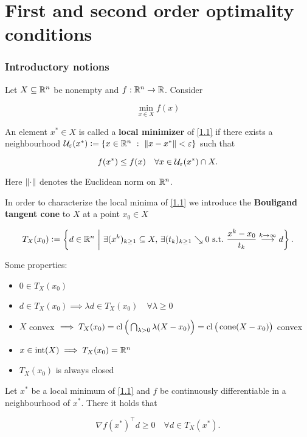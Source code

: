 \part{First and second order optimality conditions}

\section{Introductory notions}

Let \(X \subseteq \mathbb{R}^n\) be nonempty and \(f : \mathbb{R}^n \to \mathbb{R}\). Consider

\begin{equation}\label{1.1}
    \min_{x \in X} f(x)
\end{equation}

An element \(x^* \in X\) is called a \textbf{local minimizer} of \eqref{1.1} if there exists a neighbourhood \(\mathcal{U}_\varepsilon(x^*) \mathrel{\mathop:}= \{ x \in \mathbb{R}^n \ : \ \left\| x - x^* \right\| < \varepsilon \}\) such that

\begin{equation}\label{1.2}
    f(x^*) \le f(x) \quad \forall x \in \mathcal{U}_\varepsilon(x^*) \cap X.
\end{equation}

Here \(\left\| \cdot \right\|\) denotes the Euclidean norm on \(\mathbb{R}^n\).

In order to characterize the local minima of \eqref{1.1} we introduce the \textbf{Bouligand tangent cone} to \(X\) at a point \(x_0 \in X\)

\[T_X(x_0) \defeq \left\{ d \in \R^n \ \middle| \ \exists (x^k)_{k \ge 1} \subseteq X ,\, \exists (t_k)_{k \ge 1} \searrow 0 \ \mathrm{s. t.} \ \frac{x^k - x_0}{t_k} \stackrel{k \to \infty}{\longrightarrow} d \right\}.\]

Some properties:

\begin{itemize}
    \item \(0 \in T_X(x_0)\)
    \item \(d \in T_X(x_0) \implies \lambda d \in T_X(x_0) \quad \forall \lambda \ge 0\)
    \item \(X\) convex \(\implies T_X(x_0) = \operatorname{cl}\Big(\bigcap_{\lambda > 0} \lambda (X - x_0)\Big) = \operatorname{cl}\big(\operatorname{cone}(X - x_0)\big)\) convex
    \item \(x \in \operatorname{int}(X) \implies T_X(x_0) = \mathbb{R}^n\)
    \item \(T_X(x_0)\) is always closed
\end{itemize}

\begin{proposition}
    Let \(x^*\) be a local minimum of \eqref{1.1} and \(f\) be continuously differentiable in a neighbourhood of \(x^*\). There it holds that

    \begin{equation}\label{1.3}
        \nabla f(x^*)^\top d \ge 0 \quad \forall d \in T_X(x^*).
    \end{equation}
\end{proposition}

